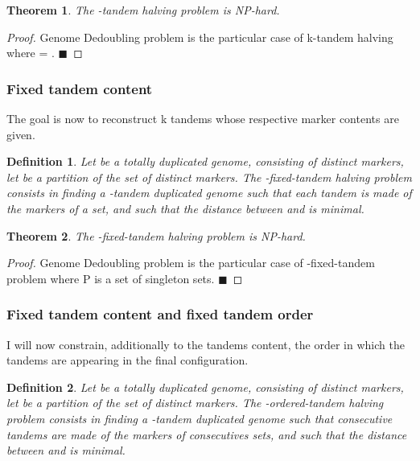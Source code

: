 \documentclass[11pt,final,twoside,nofrench]{thlifl}
\newcommand{\qed}{\ensuremath{\blacksquare}}
\newtheorem{proof}{Proof}
\newtheorem{theorem}{Theorem}
\newtheorem{definition}{Definition}
\begin{document}
{\begin{theorem}
The -tandem halving problem is NP-hard.
\end{theorem}

\begin{proof}
Genome Dedoubling problem is the particular case of k-tandem halving where  = . \qed
\end{proof}

\subsubsection{Fixed tandem content}

The goal is now to reconstruct k tandems whose respective marker contents are given.

\begin{definition}
    Let  be a totally duplicated genome, consisting of  distinct markers, let  be a partition of the set of distinct markers.
The \emph{-fixed-tandem halving} problem consists in finding a -tandem duplicated genome  such that each
    tandem is made of the markers of a  set, and such that the distance between  and  is minimal.
\end{definition}

\begin{theorem}
The -fixed-tandem halving problem is NP-hard.
\end{theorem}

\begin{proof}
    Genome Dedoubling problem is the particular case of
    -fixed-tandem problem where P is a set of singleton sets. \qed
\end{proof}

\subsubsection{Fixed tandem content and fixed tandem order}

I will now constrain, additionally to the tandems content, the order in which
the tandems are appearing in the final configuration.

\begin{definition}
    Let  be a totally duplicated genome, consisting of  distinct markers, let  be a partition of the set of distinct markers.
The \emph{-ordered-tandem halving} problem consists in finding a -tandem duplicated genome  such that consecutive tandems are made of the markers of consecutives  sets, and such that the distance between  and  is minimal.
\end{definition}

}
\end{document}
